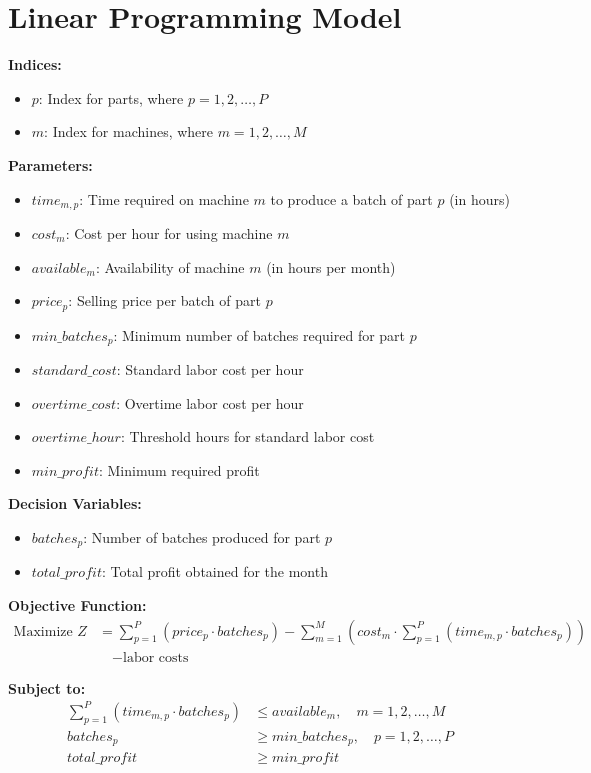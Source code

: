 \documentclass{article}
\begin{document}
\section*{Linear Programming Model}

\textbf{Indices:}
\begin{itemize}
    \item $p$: Index for parts, where $p = 1, 2, \ldots, P$
    \item $m$: Index for machines, where $m = 1, 2, \ldots, M$
\end{itemize}

\textbf{Parameters:}
\begin{itemize}
    \item $time_{m,p}$: Time required on machine $m$ to produce a batch of part $p$ (in hours)
    \item $cost_{m}$: Cost per hour for using machine $m$
    \item $available_{m}$: Availability of machine $m$ (in hours per month)
    \item $price_{p}$: Selling price per batch of part $p$
    \item $min\_batches_{p}$: Minimum number of batches required for part $p$
    \item $standard\_cost$: Standard labor cost per hour
    \item $overtime\_cost$: Overtime labor cost per hour
    \item $overtime\_hour$: Threshold hours for standard labor cost
    \item $min\_profit$: Minimum required profit
\end{itemize}

\textbf{Decision Variables:}
\begin{itemize}
    \item $batches_{p}$: Number of batches produced for part $p$
    \item $total\_profit$: Total profit obtained for the month
\end{itemize}

\textbf{Objective Function:}
\begin{align*}
    \text{Maximize } Z &= \sum_{p=1}^{P} (price_{p} \cdot batches_{p}) - \sum_{m=1}^{M} (cost_{m} \cdot \sum_{p=1}^{P} (time_{m,p} \cdot batches_{p})) \\
    & \quad - \text{labor costs}
\end{align*}

\textbf{Subject to:}
\begin{align}
    \sum_{p=1}^{P} (time_{m,p} \cdot batches_{p}) & \leq available_{m}, \quad m = 1, 2, \ldots, M \label{machine_availability} \\
    batches_{p} & \geq min\_batches_{p}, \quad p = 1, 2, \ldots, P \label{min_batches} \\
    total\_profit & \geq min\_profit \label{min_profit_condition}
\end{align}
\end{document}
